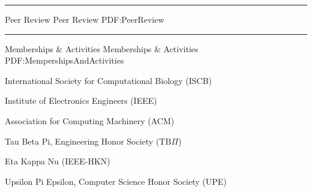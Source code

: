 \documentclass[letterpaper,MMMyyyy,nonstopmode]{simpleresumecv}
\begin{document}
\begin{Body}


\BigGap
\hrule
\Section
{Peer Review}
{Peer Review}
{PDF:PeerReview}

\BigGap
\hrule
\Section
{Memberships\newline
\& Activities}
{Memberships \& Activities}
{PDF:MempershipsAndActivities}

\Entry
{International Society for Computational Biology (ISCB)}
\hfill
\Gap

\Entry
{Institute of Electronics Engineers (IEEE)}
\hfill
\Gap

\Entry
{Association for Computing Machinery (ACM)}
\hfill
\Gap

\Entry
{Tau Beta Pi, Engineering Honor Society (TB$\Pi$)}
\hfill
\Gap

\Entry
{Eta Kappa Nu (IEEE-HKN)}
\hfill
\Gap

\Entry
{Upsilon Pi Epsilon, Computer Science Honor Society (UPE)}
\hfill
\Gap






\end{Body}
\end{document}
